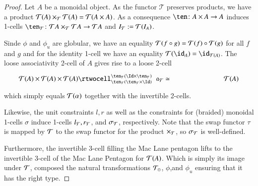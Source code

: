  \begin{proof}
Let $A$ be a monoidal object. As the functor $\mathcal{T}$ preserves products, we have a product $\mathcal{T}(A) \times_{\mathcal{T}} \mathcal{T}(A) = \mathcal{T}(A \times A)$. As a consequence $\ten\maps
  A\times A\to A$ induces 1-cells $\ten_{\mathcal{T}} \maps
 \mathcal{T}A\times_{\cT} \mathcal{T} A\to\mathcal{T}A$ and $I_{\mathcal{T}}:= \mathcal{T}(I_A)$. 
 
Sinde $\phi$ and $\phi_u$ are globular, we have an equality $\mathcal{T}(f \circ g) = \mathcal{T}(f) \circ \mathcal{T}(g)$ for all $f$ and $g$ and for the identity 1-cell we have an equality $\cT(\transid_A) = \transid_{\cT(A)}$. The loose associativity 2-cell of $A$ gives rise to a loose 2-cell
  \[\vcenter{\xymatrix@C=6pc{\cT(A)\times\cT(A)\times\cT(A) \rtwocell^{\ten_{\cT}
        (\Id\times\ten_{\cT})}_{\ten_{\cT}(\ten_{\cT}\times\Id)}{\hspace{.2cm}\fa_{\cT}\eqv} &\cT(A) }}\]
  which simply equals $\mathcal{T}(\alpha)$ together with the invertible 2-cells.
  
  Likewise, the unit constraints $l, r$ as well as the constraints for (braided) monoidal 1-cells $\sigma$ induce 1-cells $l_{\mathcal{T}}, r_{\mathcal{T}}$, and $\sigma_{\mathcal{T}}$, respectively. Note that the swap functor $\tau$ is mapped by $\mathcal{T}$ to the swap functor for the product $\times_{\mathcal{T}}$, so $\sigma_{\mathcal{T}}$ is well-defined.
  
 Furthermore, the invertible 3-cell filling the Mac Lane pentagon lifts to the invertible 3-cell of the Mac Lane Pentagon for $\mathcal{T}(A)$. Which is simply its image under $\mathcal{T}$, composed the natural transformations $\mathcal{T}_{\odot}$, $\phi$,and $\phi_u$ ensuring that it has the right type.
  

\end{proof}
